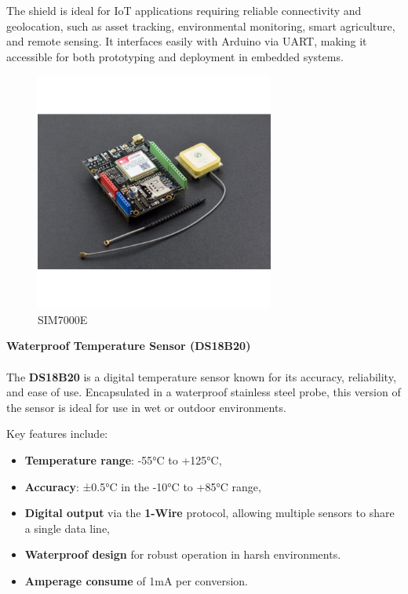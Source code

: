 The shield is ideal for IoT applications requiring reliable connectivity and 
geolocation, such as asset tracking, environmental monitoring, smart 
agriculture, and remote sensing. It interfaces easily with Arduino via UART, 
making it accessible for both prototyping and deployment in embedded systems.

\begin{figure}[H]
    \centering
    \includegraphics[width=0.7\textwidth]{images/chapter/design/components/SIM7000.png}  %
    \caption{SIM7000E}
    \label{fig:SIM7000E}        
\end{figure}

\textbf{Waterproof Temperature Sensor (DS18B20)}\\\\
The \textbf{DS18B20} is a digital temperature sensor known for its accuracy, reliability, and ease of use. Encapsulated in a waterproof stainless steel probe, this version of the sensor is ideal for use in wet or outdoor environments.

Key features include:

\begin{itemize}
    \item \textbf{Temperature range}: -55°C to +125°C,
    \item \textbf{Accuracy}: ±0.5°C in the -10°C to +85°C range,
    \item \textbf{Digital output} via the \textbf{1-Wire} protocol, allowing multiple sensors to share a single data line,
    \item \textbf{Waterproof design} for robust operation in harsh environments.
    \item \textbf{Amperage consume} of 1mA per conversion.
\end{itemize} 

